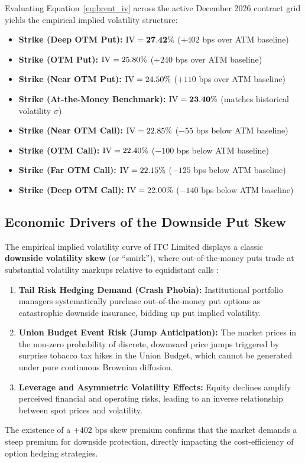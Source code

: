 Evaluating Equation~\eqref{eq:brent_iv} across the active December 2026 contract grid yields the empirical implied volatility structure:
\begin{itemize}[leftmargin=1.5em, itemsep=1.5pt, parsep=0pt]
    \item \textbf{Strike  (Deep OTM Put):} $\operatorname{IV} = \mathbf{27.42\%}$ ($+402$ bps over ATM baseline)
    \item \textbf{Strike  (OTM Put):} $\operatorname{IV} = 25.80\%$ ($+240$ bps over ATM baseline)
    \item \textbf{Strike  (Near OTM Put):} $\operatorname{IV} = 24.50\%$ ($+110$ bps over ATM baseline)
    \item \textbf{Strike  (At-the-Money Benchmark):} $\operatorname{IV} = \mathbf{23.40\%}$ (matches historical volatility $\sigma$)
    \item \textbf{Strike  (Near OTM Call):} $\operatorname{IV} = 22.85\%$ ($-55$ bps below ATM baseline)
    \item \textbf{Strike  (OTM Call):} $\operatorname{IV} = 22.40\%$ ($-100$ bps below ATM baseline)
    \item \textbf{Strike  (Far OTM Call):} $\operatorname{IV} = 22.15\%$ ($-125$ bps below ATM baseline)
    \item \textbf{Strike  (Deep OTM Call):} $\operatorname{IV} = 22.00\%$ ($-140$ bps below ATM baseline)
\end{itemize}

\subsection{Economic Drivers of the Downside Put Skew}

The empirical implied volatility curve of ITC Limited displays a classic \textbf{downside volatility skew} (or ``smirk''), where out-of-the-money puts trade at substantial volatility markups relative to equidistant calls \citep{bakshi1997empirical}:
\begin{enumerate}[leftmargin=1.5em, itemsep=1.5pt, parsep=0pt, label=(\alph*)]
    \item \textbf{Tail Risk Hedging Demand (Crash Phobia):} Institutional portfolio managers systematically purchase out-of-the-money put options as catastrophic downside insurance, bidding up put implied volatility.
    \item \textbf{Union Budget Event Risk (Jump Anticipation):} The market prices in the non-zero probability of discrete, downward price jumps triggered by surprise tobacco tax hikes in the Union Budget, which cannot be generated under pure continuous Brownian diffusion.
    \item \textbf{Leverage and Asymmetric Volatility Effects:} Equity declines amplify perceived financial and operating risks, leading to an inverse relationship between spot prices and volatility.
\end{enumerate}

The existence of a $+402$ bps skew premium confirms that the market demands a steep premium for downside protection, directly impacting the cost-efficiency of option hedging strategies.

\clearpage

